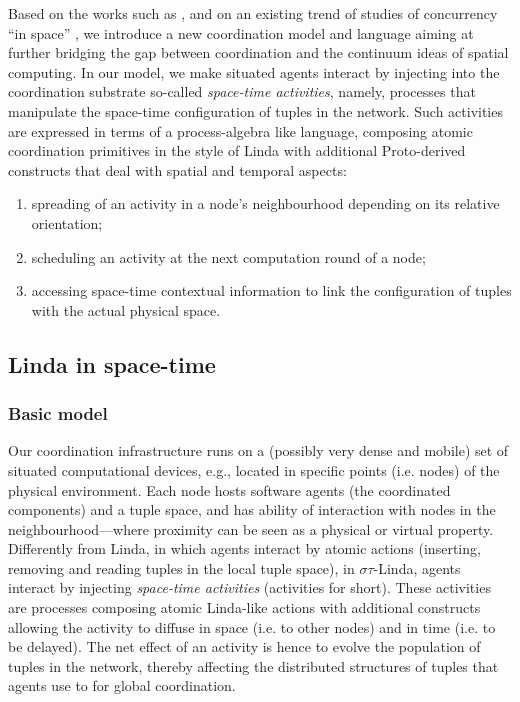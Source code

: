 \documentclass[12pt,a4paper,twoside,openright]{book}
\begin{document}
Based on the works such as \cite{VCMZ-TAAS2011,mamei2009acm,klaim,GeoLinda}, and on an existing trend of studies of concurrency ``in space'' \cite{ambients,CardelliG10,SpatialComputing,proto}, we introduce a new coordination model and language aiming at further bridging the gap between coordination and the continuum ideas of spatial computing.
%
In our model, we make situated agents interact by injecting into the coordination substrate so-called \emph{space-time activities}, namely, processes that manipulate the space-time configuration of tuples in the network.
%
Such activities are expressed in terms of a process-algebra like language, composing atomic coordination primitives in the style of Linda with additional Proto-derived constructs that deal with spatial and temporal aspects:
\begin{enumerate}
 \item spreading of an activity in a node's neighbourhood depending on its relative orientation;
 \item scheduling an activity at the next computation round of a node;
 \item accessing space-time contextual information to link the configuration of tuples with the actual physical space.
\end{enumerate}

\subsection{Linda in space-time}

\subsubsection{Basic model}

Our coordination infrastructure runs on a (possibly very dense and mobile) set of situated computational devices, e.g., located in specific points (i.e. nodes) of the physical environment. 
%
Each node hosts software agents (the coordinated components) and a tuple space, and has ability of interaction with nodes in the neighbourhood---where proximity can be seen as a physical or virtual property.
%
Differently from Linda, in which agents interact by atomic actions (inserting, removing and reading tuples in the local tuple space), in $\sigma\tau$-Linda, agents interact by injecting \emph{space-time activities} (activities for short).
%
These activities are processes composing atomic Linda-like actions with additional constructs allowing the activity to diffuse in space (i.e. to other nodes) and in time (i.e. to be delayed).
%
The net effect of an activity is hence to evolve the population of tuples in the network, thereby affecting the distributed structures of tuples that agents use to for global coordination.
\end{document}

